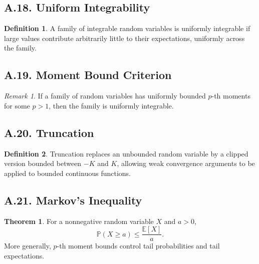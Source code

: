 \documentclass[11pt]{article}
\theoremstyle{definition}
\newtheorem{definition}{Definition}
\newtheorem{theorem}{Theorem}
\theoremstyle{remark}
\newtheorem{remark}{Remark}
\begin{document}
\subsection*{A.18. Uniform Integrability}
\begin{definition}
A family of integrable random variables is uniformly integrable if large values contribute arbitrarily little to their expectations, uniformly across the family.
\end{definition}

\subsection*{A.19. Moment Bound Criterion}
\begin{remark}
If a family of random variables has uniformly bounded \(p\)-th moments for some \(p>1\), then the family is uniformly integrable.
\end{remark}

\subsection*{A.20. Truncation}
\begin{definition}
Truncation replaces an unbounded random variable by a clipped version bounded between \(-K\) and \(K\), allowing weak convergence arguments to be applied to bounded continuous functions.
\end{definition}

\subsection*{A.21. Markov's Inequality}
\begin{theorem}
For a nonnegative random variable \(X\) and \(a>0\),
\[
\mathbb P(X\ge a)\le \frac{\mathbb E[X]}{a}.
\]
More generally, \(p\)-th moment bounds control tail probabilities and tail expectations.
\end{theorem}
\end{document}
